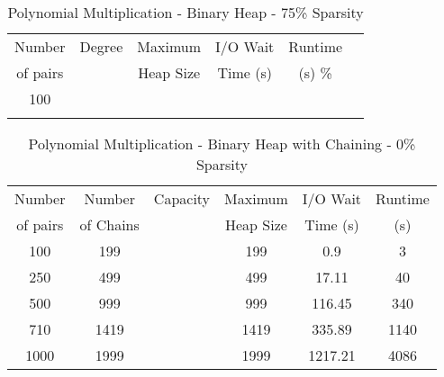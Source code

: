 \documentclass[11pt, one-sided]{amsart}
\begin{document}
\begin{table}[htbp]
   \centering
      \caption{Polynomial Multiplication - Binary Heap - 75\% Sparsity}
   \begin{tabular}{|c|c|c|c|c|c|}
   	\hline
		 Number   & 	Degree	& Maximum & I/O Wait		& Runtime 	 \\ 
		 of pairs 	&			& Heap Size	& Time (s)		&	(s)		 		\%				\\ \hline
		 100		&			&			&			&						\\
		 		&			&			&			&						\\
   \end{tabular}
   \label{tab:booktabs}
\end{table}


\newpage



\begin{table}[htbp]
   \centering
      \caption{Polynomial Multiplication - Binary Heap with Chaining - 0\% Sparsity}
   \begin{tabular}{|c|c|c|c|c|c|}
   	\hline
		 Number   & 	Number 	&Capacity		& Maximum	& I/O Wait		& Runtime 	 \\ 
		 of pairs 	&	of Chains	& 			&Heap Size	& Time (s)		&	(s)		 \\ \hline
		 100		&	199		&			&	199		&	0.9		&	3		\\
		 250		&	499		&			&	499		&	17.11	&	40		\\
		 500		&	999		&			&	999		&	116.45	&	340		\\
		710		&	1419		&			&	1419		&	335.89	&	1140		\\
		1000		&	1999		&			&	1999		&	1217.21	&	4086		\\
	\hline
   \end{tabular}
   \label{tab:booktabs}
\end{table}
\end{document}
